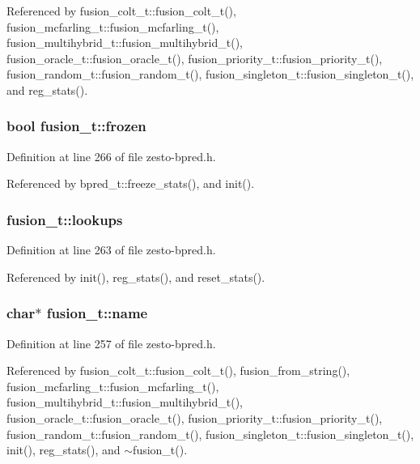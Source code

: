 Referenced by fusion\_\-colt\_\-t::fusion\_\-colt\_\-t(), fusion\_\-mcfarling\_\-t::fusion\_\-mcfarling\_\-t(), fusion\_\-multihybrid\_\-t::fusion\_\-multihybrid\_\-t(), fusion\_\-oracle\_\-t::fusion\_\-oracle\_\-t(), fusion\_\-priority\_\-t::fusion\_\-priority\_\-t(), fusion\_\-random\_\-t::fusion\_\-random\_\-t(), fusion\_\-singleton\_\-t::fusion\_\-singleton\_\-t(), and reg\_\-stats().
\subsubsection[{frozen}]{\setlength{\rightskip}{0pt plus 5cm}bool {\bf fusion\_\-t::frozen}\hspace{0.3cm}{\tt  [protected]}}\label{classfusion__t_34715b7ae32a370b5ab8b6665500d474}




Definition at line 266 of file zesto-bpred.h.

Referenced by bpred\_\-t::freeze\_\-stats(), and init().
\subsubsection[{lookups}]{ {\bf fusion\_\-t::lookups}\hspace{0.3cm}{\tt  [protected]}}\label{classfusion__t_ca5bb14f422e74aa3d055b41b45c75aa}




Definition at line 263 of file zesto-bpred.h.

Referenced by init(), reg\_\-stats(), and reset\_\-stats().
\subsubsection[{name}]{\setlength{\rightskip}{0pt plus 5cm}char$\ast$ {\bf fusion\_\-t::name}\hspace{0.3cm}{\tt  [protected]}}\label{classfusion__t_9fc6daa850cc2f748b839bcd8dedf9ea}




Definition at line 257 of file zesto-bpred.h.

Referenced by fusion\_\-colt\_\-t::fusion\_\-colt\_\-t(), fusion\_\-from\_\-string(), fusion\_\-mcfarling\_\-t::fusion\_\-mcfarling\_\-t(), fusion\_\-multihybrid\_\-t::fusion\_\-multihybrid\_\-t(), fusion\_\-oracle\_\-t::fusion\_\-oracle\_\-t(), fusion\_\-priority\_\-t::fusion\_\-priority\_\-t(), fusion\_\-random\_\-t::fusion\_\-random\_\-t(), fusion\_\-singleton\_\-t::fusion\_\-singleton\_\-t(), init(), reg\_\-stats(), and $\sim$fusion\_\-t().
